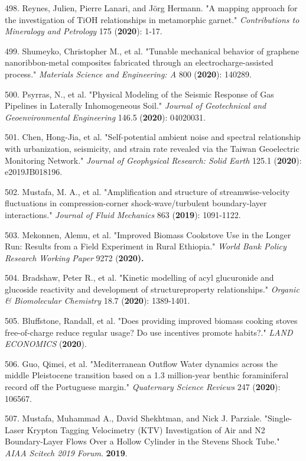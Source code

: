 498. Reynes, Julien, Pierre Lanari, and J\"{o}rg Hermann. "A mapping approach for the investigation of Ti\textendash{}OH relationships in metamorphic garnet." \textit{Contributions to Mineralogy and Petrology} 175 (\textbf{2020}): 1-17.

499. Shumeyko, Christopher M., et al. "Tunable mechanical behavior of graphene nanoribbon-metal composites fabricated through an electrocharge-assisted process." \textit{Materials Science and Engineering: A} 800 (\textbf{2020}): 140289.

500. Psyrras, N., et al. "Physical Modeling of the Seismic Response of Gas Pipelines in Laterally Inhomogeneous Soil." \textit{Journal of Geotechnical and Geoenvironmental Engineering} 146.5 (\textbf{2020}): 04020031.

501. Chen, Hong-Jia, et al. "Self-potential ambient noise and spectral relationship with urbanization, seismicity, and strain rate revealed via the Taiwan Geoelectric Monitoring Network." \textit{Journal of Geophysical Research: Solid Earth} 125.1 (\textbf{2020}): e2019JB018196.

502. Mustafa, M. A., et al. "Amplification and structure of streamwise-velocity fluctuations in compression-corner shock-wave/turbulent boundary-layer interactions." \textit{Journal of Fluid Mechanics} 863 (\textbf{2019}): 1091-1122.

503. Mekonnen, Alemu, et al. "Improved Biomass Cookstove Use in the Longer Run: Results from a Field Experiment in Rural Ethiopia." \textit{World Bank Policy Research Working Paper} 9272 (\textbf{2020).}

504. Bradshaw, Peter R., et al. "Kinetic modelling of acyl glucuronide and glucoside reactivity and development of structure\textendash{}property relationships." \textit{Organic \& Biomolecular Chemistry} 18.7 (\textbf{2020}): 1389-1401.

505. Bluffstone, Randall, et al. "Does providing improved biomass cooking stoves free-of-charge reduce regular usage? Do use incentives promote habits?." \textit{LAND ECONOMICS} (\textbf{2020}).

506. Guo, Qimei, et al. "Mediterranean Outflow Water dynamics across the middle Pleistocene transition based on a 1.3 million-year benthic foraminiferal record off the Portuguese margin." \textit{Quaternary Science Reviews} 247 (\textbf{2020}): 106567.

507. Mustafa, Muhammad A., David Shekhtman, and Nick J. Parziale. "Single-Laser Krypton Tagging Velocimetry (KTV) Investigation of Air and N2 Boundary-Layer Flows Over a Hollow Cylinder in the Stevens Shock Tube." \textit{AIAA Scitech 2019 Forum}. \textbf{2019}.

